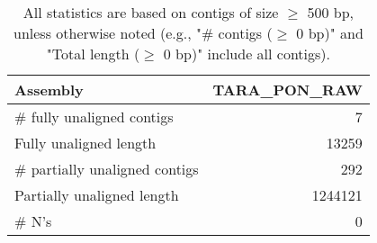 \documentclass[12pt,a4paper]{article}
\begin{document}
\begin{table}[ht]
\begin{center}
\caption{All statistics are based on contigs of size $\geq$ 500 bp, unless otherwise noted (e.g., "\# contigs ($\geq$ 0 bp)" and "Total length ($\geq$ 0 bp)" include all contigs).}
\begin{tabular}{|l*{1}{|r}|}
\hline
Assembly & TARA\_PON\_RAW \\ \hline
\# fully unaligned contigs & 7 \\ \hline
Fully unaligned length & 13259 \\ \hline
\# partially unaligned contigs & 292 \\ \hline
Partially unaligned length & 1244121 \\ \hline
\# N's & 0 \\ \hline
\end{tabular}
\end{center}
\end{table}
\end{document}
